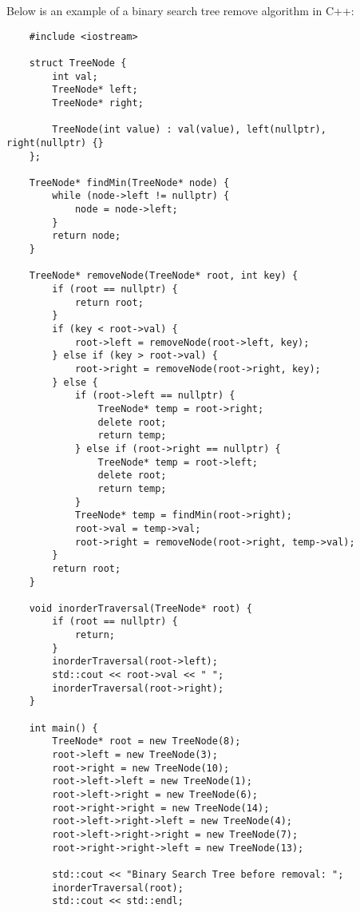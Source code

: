 \begin{solution}
    Below is an example of a binary search tree remove algorithm in C++:

    \horizontalline

    \begin{verbatim}
    #include <iostream>

    struct TreeNode {
        int val;
        TreeNode* left;
        TreeNode* right;
    
        TreeNode(int value) : val(value), left(nullptr), right(nullptr) {}
    };
    
    TreeNode* findMin(TreeNode* node) {
        while (node->left != nullptr) {
            node = node->left;
        }
        return node;
    }
    
    TreeNode* removeNode(TreeNode* root, int key) {
        if (root == nullptr) {
            return root;
        }
        if (key < root->val) {
            root->left = removeNode(root->left, key);
        } else if (key > root->val) {
            root->right = removeNode(root->right, key);
        } else {
            if (root->left == nullptr) {
                TreeNode* temp = root->right;
                delete root;
                return temp;
            } else if (root->right == nullptr) {
                TreeNode* temp = root->left;
                delete root;
                return temp;
            }
            TreeNode* temp = findMin(root->right);
            root->val = temp->val;
            root->right = removeNode(root->right, temp->val);
        }
        return root;
    }
    
    void inorderTraversal(TreeNode* root) {
        if (root == nullptr) {
            return;
        }
        inorderTraversal(root->left);
        std::cout << root->val << " ";
        inorderTraversal(root->right);
    }
    
    int main() {
        TreeNode* root = new TreeNode(8);
        root->left = new TreeNode(3);
        root->right = new TreeNode(10);
        root->left->left = new TreeNode(1);
        root->left->right = new TreeNode(6);
        root->right->right = new TreeNode(14);
        root->left->right->left = new TreeNode(4);
        root->left->right->right = new TreeNode(7);
        root->right->right->left = new TreeNode(13);
    
        std::cout << "Binary Search Tree before removal: ";
        inorderTraversal(root);
        std::cout << std::endl;
    

\end{verbatim}
\end{solution}
